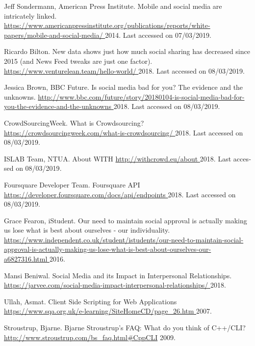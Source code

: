 
\begin{thebibliography}{1}


\bibitem{[AMP+14]} {\textlatin{
{Jeff Sondermann, American Press Institute}.
Mobile and social media are intricately linked.
\url{https://www.americanpressinstitute.org/publications/reports/white-papers/mobile-and-social-media/ }
  2014. Last accessed on 07/03/2019}}.
  
\bibitem{[VEN+18]} {\textlatin{
{Ricardo Bilton}.
New data shows just how much social sharing has decreased since 2015 (and News Feed tweaks are just one factor).
\url{https://www.venturelean.team/hello-world/ }
  2018. Last accessed on 08/03/2019}}.
  
\bibitem{[BBC+18]} {\textlatin{
{Jessica Brown, BBC Future}.
Is social media bad for you? The evidence and the unknowns.
\url{http://www.bbc.com/future/story/20180104-is-social-media-bad-for-you-the-evidence-and-the-unknowns }
  2018. Last accessed on 08/03/2019}}.

\bibitem{[CSW+18]} {\textlatin{
{CrowdSourcingWeek}.
What is Crowdsourcing?
\url{https://crowdsourcingweek.com/what-is-crowdsourcing/ }
  2018. Last accessed on 08/03/2019}}.
  
\bibitem{[WIT+18]} {\textlatin{
{ISLAB Team, NTUA}.
About WITH
\url{http://withcrowd.eu/about }
  2018. Last accessed on 08/03/2019}}.
 
\bibitem{[4SQ+18]} {\textlatin{
{Foursquare Developer Team}.
Foursquare API
\url{https://developer.foursquare.com/docs/api/endpoints }
  2018. Last accessed on 08/03/2019}}.
  
\bibitem{[IND+16]} {\textlatin{
{Grace Fearon, iStudent}.
Our need to maintain social approval is actually making us lose what is best about ourselves - our individuality.
\url{https://www.independent.co.uk/student/istudents/our-need-to-maintain-social-approval-is-actually-making-us-lose-what-is-best-about-ourselves-our-a6827316.html }
   2016}}.
  
\bibitem{[JAR+18]} {\textlatin{
{Mansi Beniwal}.
Social Media and its Impact in Interpersonal Relationships.
\url{https://jarvee.com/social-media-impact-interpersonal-relationships/ }
  2018}}.
  
\bibitem{[SQA+07]} {\textlatin{
{Ullah, Asmat}.
Client Side Scripting for Web Applications
\url{https://www.sqa.org.uk/e-learning/SiteHomeCD/page_26.htm }
  2007}}.
  
\bibitem{[STR+09]} {\textlatin{
{Stroustrup, Bjarne}.
Bjarne Stroustrup's FAQ: What do you think of C++/CLI?
\url{http://www.stroustrup.com/bs_faq.html#CppCLI}
  2009}}.
  

\end{thebibliography}
